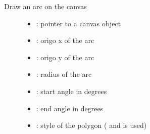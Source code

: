 \documentclass[letterpaper,10pt,english]{sphinxmanual}
\begin{document}
\begin{fulllineitems}
\label{\detokenize{object-types/canvas:_CPPv418lv_canvas_draw_arcP8lv_obj_t10lv_coord_t10lv_coord_t10lv_coord_t7int32_t7int32_tPK10lv_style_t}}%
\pysigstartmultiline
{}\label{\detokenize{object-types/canvas:lv__canvas_8h_1a33ba18b127c96c4c82d3d976be7200e9}}%
\pysigstopmultiline
Draw an arc on the canvas \begin{description}
\item[{}] \leavevmode\begin{itemize}
\item {} 
: pointer to a canvas object 

\item {} 
: origo x of the arc 

\item {} 
: origo y of the arc 

\item {} 
: radius of the arc 

\item {} 
: start angle in degrees 

\item {} 
: end angle in degrees 

\item {} 
: style of the polygon ( and  is used) 

\end{itemize}

\end{description}


\end{fulllineitems}

\end{document}
